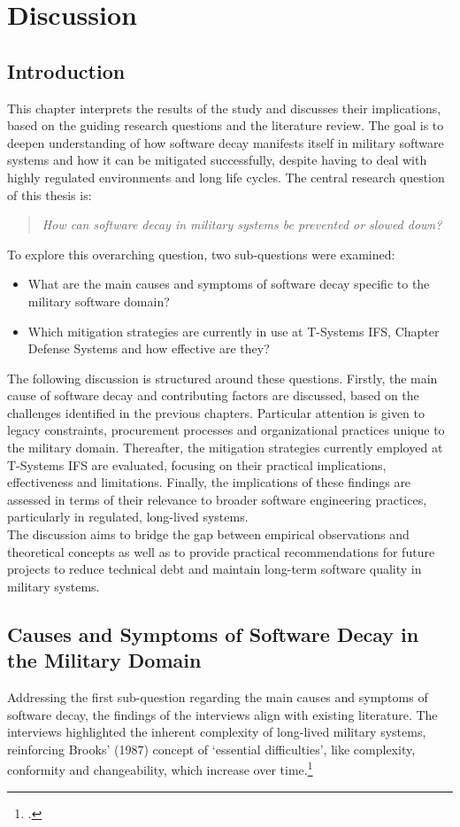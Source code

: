 \section{Discussion}
\subsection{Introduction}
This chapter interprets the results of the study and discusses their implications, based on the guiding research questions and the literature review. The goal is to deepen understanding of how software decay manifests itself in military software systems
and how it can be mitigated successfully, despite having to deal with highly regulated environments and long life cycles.
The central research question of this thesis is:
\begin{quote}
\textit{How can software decay in military systems be prevented or slowed down?}
\end{quote}
To explore this overarching question, two sub-questions were examined:
\begin{itemize}
    \item What are the main causes and symptoms of software decay specific to the military software domain?
    \item Which mitigation strategies are currently in use at T-Systems IFS, Chapter Defense Systems and how effective are they?
\end{itemize}
The following discussion is structured around these questions. Firstly, the main cause of software decay and contributing factors are discussed, based on the challenges identified in the previous chapters. Particular attention is given to legacy constraints, procurement processes and organizational practices unique to the military domain.
Thereafter, the mitigation strategies currently employed at T-Systems IFS are evaluated, focusing on their practical implications, effectiveness and limitations. Finally, the implications of these findings are assessed in terms of their relevance to broader software engineering practices, particularly in regulated, long-lived systems.\\
The discussion aims to bridge the gap between empirical observations and theoretical concepts as well as to provide practical recommendations for future projects to reduce technical debt and maintain long-term software quality in military systems.\\

\subsection{Causes and Symptoms of Software Decay in the Military Domain}
Addressing the first sub-question regarding the main causes and symptoms of software decay, the findings of the interviews align with existing literature. The interviews highlighted the inherent complexity of long-lived military systems, reinforcing Brooks' (1987) concept of `essential difficulties', like complexity, conformity and changeability, which increase over time.\footcite[2-3]{brooksNoSilverBullet1987}\\

